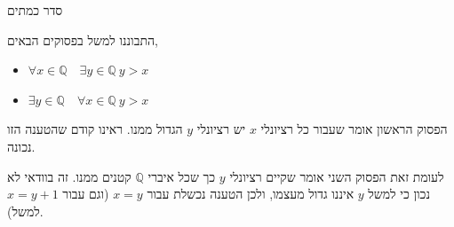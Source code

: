 \documentclass[aspectratio=169]{beamer}
\begin{document}
\begin{frame}{סדר כמתים}

	התבוננו למשל בפסוקים הבאים,
	\begin{itemize}
		\item $\forall x\in\mathbb{Q}\quad\exists y\in\mathbb{Q}\ y>x$
		\item $\exists y\in\mathbb{Q}\quad\forall x\in\mathbb{Q}\ y>x$
	\end{itemize}


	הפסוק הראשון אומר שעבור כל רציונלי $x$ יש רציונלי $y$ הגדול ממנו. ראינו קודם שהטענה הזו נכונה.

	לעומת זאת הפסוק השני אומר שקיים רציונלי $y$ כך שכל איברי $\mathbb{Q}$ קטנים ממנו. זה בוודאי לא נכון כי למשל $y$ איננו גדול מעצמו, ולכן הטענה נכשלת עבור $x=y$ (וגם עבור $x=y+1$ למשל).
\end{frame}
\end{document}
